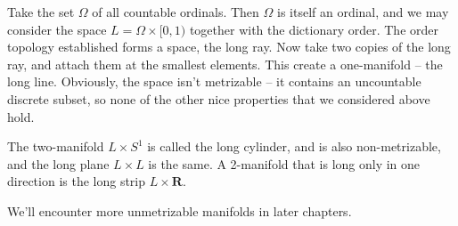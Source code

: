 \begin{example}
    Take the set $\Omega$ of all countable ordinals. Then $\Omega$ is itself an ordinal, and we may consider the space $L = \Omega \times [0,1)$ together with the dictionary order. The order topology established forms a space, the long ray. Now take two copies of the long ray, and attach them at the smallest elements. This create a one-manifold -- the long line. Obviously, the space isn't metrizable -- it contains an uncountable discrete subset, so none of the other nice properties that we considered above hold.
\end{example}

\begin{example}
    The two-manifold $L \times S^1$ is called the long cylinder, and is also non-metrizable, and the long plane $L \times L$ is the same. A 2-manifold that is long only in one direction is the long strip $L \times \mathbf{R}$.
\end{example}

We'll encounter more unmetrizable manifolds in later chapters.




















